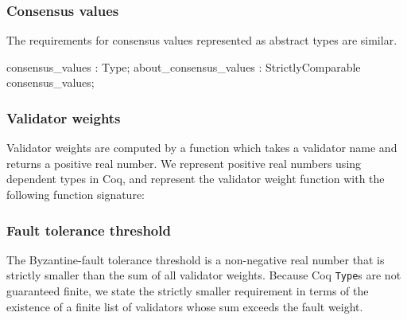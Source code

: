\documentclass[runningheads]{llncs}
\begin{document}
\subsubsection{Consensus values} 
The requirements for consensus values represented as abstract types are similar. 
\begin{coq}
	consensus_values : Type; 
	about_consensus_values : StrictlyComparable consensus_values; 
\end{coq}
\subsubsection{Validator weights} 
Validator weights are computed by a function which takes a validator name and returns a positive real number. We represent positive real numbers using dependent types in Coq, and represent the validator weight function with the following function signature: 
\subsubsection{Fault tolerance threshold} 
The Byzantine-fault tolerance threshold is a non-negative real number that is strictly smaller than the sum of all validator weights. Because Coq \verb|Type|s are not guaranteed finite, we state the strictly smaller requirement in terms of the existence of a finite list of validators whose sum exceeds the fault weight. 
\end{document}

